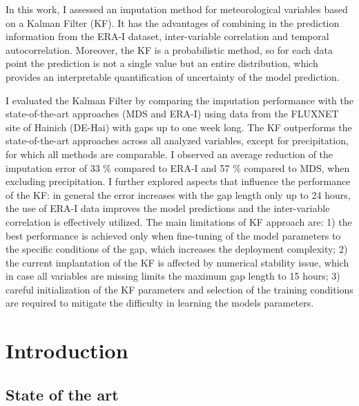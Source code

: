 \documentclass{article}
\let\Oldsection\section
\renewcommand{\section}{\FloatBarrier\Oldsection}
\let\Oldsubsection\subsection
\renewcommand{\subsection}{\FloatBarrier\Oldsubsection}
\begin{document}
In this work, I assessed an imputation method for meteorological variables based on a Kalman Filter (KF). It has the advantages of combining in the prediction information from the ERA-I dataset, inter-variable correlation and  temporal autocorrelation. Moreover, the KF is a probabilistic method, so for each data point the prediction is not a single value but an entire distribution, which provides an interpretable quantification of uncertainty of the model prediction.

I evaluated the Kalman Filter by  comparing the imputation performance with the state-of-the-art approaches (MDS and ERA-I) using data from the FLUXNET site of Hainich (DE-Hai) with gaps up to one week long. The KF outperforms the state-of-the-art approaches across all analyzed variables, except for precipitation, for which all methods are comparable. I observed an average reduction of the imputation error of 33 \% compared to ERA-I and  57 \% compared to MDS, when excluding precipitation. I further explored aspects that influence the performance of the KF: in general the error increases with the gap length only up to 24 hours, the use of ERA-I data improves the model predictions and the inter-variable correlation is effectively utilized.
The main limitations of KF approach are: 1) the best performance is achieved only when fine-tuning of the model parameters to the specific conditions of the gap, which increases the deployment complexity; 2) the current implantation of the KF is affected by numerical stability issue, which in case all variables are missing limits the maximum gap length to 15 hours; 3) careful initialization of the KF parameters and selection of the training conditions are required to mitigate the difficulty in learning the models parameters. 
\clearpage
\thispagestyle{empty}

\tableofcontents
\thispagestyle{empty}
\clearpage

\section{Introduction}

\subsection{State of the art}
\end{document}
